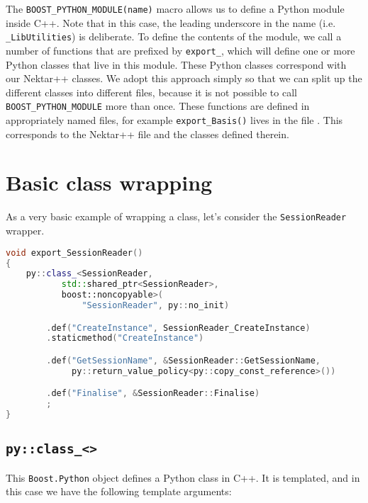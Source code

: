 The \texttt{BOOST\_PYTHON\_MODULE(name)} macro allows us to define a Python module inside
C++. Note that in this case, the leading underscore in the name
(i.e. \texttt{\_LibUtilities}) is deliberate. To define the contents of the module, we
call a number of functions that are prefixed by \texttt{export\_}, which will define one
or more Python classes that live in this module. These Python classes correspond
with our Nektar++ classes. We adopt this approach simply so that we can split up
the different classes into different files, because it is not possible to call
\texttt{BOOST\_PYTHON\_MODULE} more than once. These functions are defined in
appropriately named files, for example \texttt{export\_Basis()} lives in the file 
. This corresponds to the Nektar++ file 
 and the classes defined therein.

\section{Basic class wrapping}

As a very basic example of wrapping a class, let's consider the \texttt{SessionReader}
wrapper.

\begin{lstlisting}[caption={Basic class wrapping with Boost.Python}, label={lst:basic_class_wrapping}, language=C++]
void export_SessionReader()
{
    py::class_<SessionReader,
           std::shared_ptr<SessionReader>,
           boost::noncopyable>(
               "SessionReader", py::no_init)

        .def("CreateInstance", SessionReader_CreateInstance)
        .staticmethod("CreateInstance")

        .def("GetSessionName", &SessionReader::GetSessionName,
             py::return_value_policy<py::copy_const_reference>())

        .def("Finalise", &SessionReader::Finalise)
        ;
}
\end{lstlisting}

\subsection{\texttt{py::class\_<>}}

This \texttt{Boost.Python} object defines a Python class in C++. It is templated, and
in this case we have the following template arguments:

